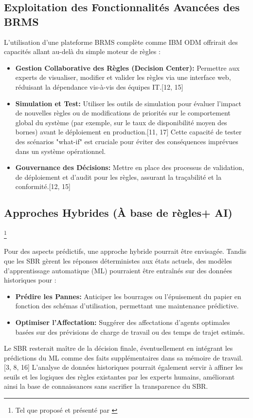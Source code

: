 \documentclass[11pt,a4paper]{article}
\begin{document}
\subsection{Exploitation des Fonctionnalités Avancées des BRMS}

L'utilisation d'une plateforme BRMS complète comme IBM ODM offrirait des capacités allant au-delà du simple moteur de règles :
\begin{itemize}
    \item \textbf{Gestion Collaborative des Règles (Decision Center):} Permettre aux experts de visualiser, modifier et valider les règles via une interface web, réduisant la dépendance vis-à-vis des équipes IT.[12, 15]
    \item \textbf{Simulation et Test:} Utiliser les outils de simulation pour évaluer l'impact de nouvelles règles ou de modifications de priorités sur le comportement global du système (par exemple, sur le taux de disponibilité moyen des bornes) avant le déploiement en production.[11, 17] Cette capacité de tester des scénarios "what-if" est cruciale pour éviter des conséquences imprévues dans un système opérationnel.
    \item \textbf{Gouvernance des Décisions:} Mettre en place des processus de validation, de déploiement et d'audit pour les règles, assurant la traçabilité et la conformité.[12, 15]
\end{itemize}

\subsection{Approches Hybrides (À base de règles+ AI)}\footnote{Tel que proposé et présenté par \citep{loyerProjet1Modelisation2025}}

Pour des aspects prédictifs, une approche hybride pourrait être envisagée. Tandis que les SBR gèrent les réponses déterministes aux états actuels, des modèles d'apprentissage automatique (ML) pourraient être entraînés sur des données historiques pour :
\begin{itemize}
    \item \textbf{Prédire les Pannes:} Anticiper les bourrages ou l'épuisement du papier en fonction des schémas d'utilisation, permettant une maintenance prédictive.
    \item \textbf{Optimiser l'Affectation:} Suggérer des affectations d'agents optimales basées sur des prévisions de charge de travail ou des temps de trajet estimés.
\end{itemize}
Le SBR resterait maître de la décision finale, éventuellement en intégrant les prédictions du ML comme des faits supplémentaires dans sa mémoire de travail.[3, 8, 16] L'analyse de données historiques pourrait également servir à affiner les seuils et les logiques des règles existantes par les experts humains, améliorant ainsi la base de connaissances sans sacrifier la transparence du SBR.
\end{document}
